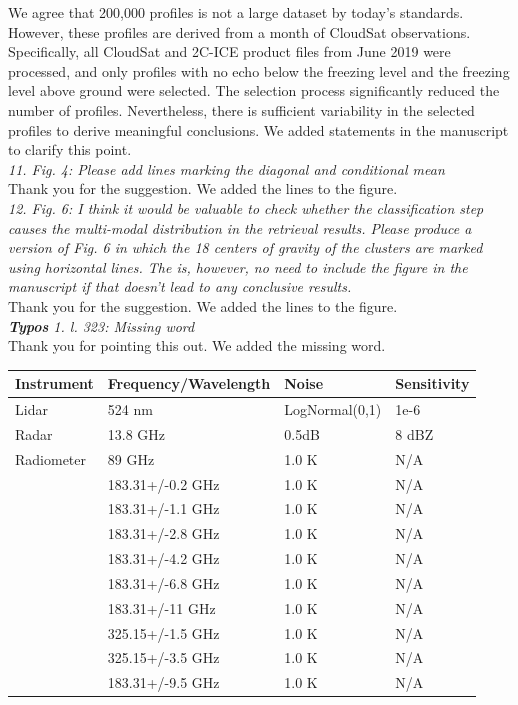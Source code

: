 \documentclass[12pt]{article}
\begin{document}
\newline
We agree that 200,000 profiles is not a large dataset by today's standards.  However, these profiles are derived from a month of CloudSat observations.
Specifically, all CloudSat and 2C-ICE product files from June 2019 were processed, and only profiles with no echo below the freezing level
and the freezing level above ground were selected. The selection process significantly reduced the number of profiles. Nevertheless, there is sufficient
variability in the selected profiles to derive meaningful conclusions. We added statements in the manuscript to clarify this point.\\
\newline
\textit{11. Fig. 4: Please add lines marking the diagonal and conditional mean}\\
\newline
Thank you for the suggestion. We added the lines to the figure.\\
\newline   
\textit{12. Fig. 6: I think it would be valuable to check whether the classification step causes the multi-modal distribution 
    in the retrieval results. Please produce a version of Fig. 6 in which the 18 centers of gravity of the clusters 
    are marked using horizontal lines. The is, however, no need to include the figure in the manuscript if that doesn't lead
     to any conclusive results.}\\
\newline
Thank you for the suggestion.  We added the lines to the figure.\\
\newline  
\textit{\textbf{Typos}
    1. l. 323: Missing word}\\
\newline
Thank you for pointing this out.  We added the missing word.\\
\newline

\begin{longtable}[]{@{}llll@{}}

    Instrument & Frequency/Wavelength & Noise & Sensitivity \\
    \hline
    \endhead
    Lidar & 524 nm & LogNormal(0,1) & 1e-6 \\
    Radar & 13.8 GHz & 0.5dB & 8 dBZ \\
    Radiometer & 89 GHz & 1.0 K & N/A \\
    & 183.31+/-0.2 GHz & 1.0 K & N/A \\
    & 183.31+/-1.1 GHz & 1.0 K & N/A \\
    & 183.31+/-2.8 GHz & 1.0 K & N/A \\
    & 183.31+/-4.2 GHz & 1.0 K & N/A \\
    & 183.31+/-6.8 GHz & 1.0 K & N/A \\
    & 183.31+/-11 GHz & 1.0 K & N/A \\
    & 325.15+/-1.5 GHz & 1.0 K & N/A \\
    & 325.15+/-3.5 GHz & 1.0 K & N/A \\
    & 183.31+/-9.5 GHz & 1.0 K & N/A \\
   \hline 
    \end{longtable}
\end{document}
